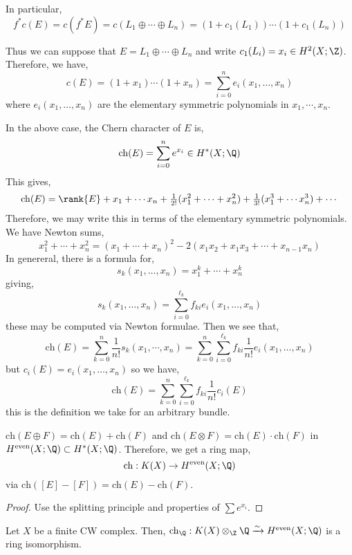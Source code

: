 \documentclass[12pt]{extarticle}
\begin{document}
\begin{rmk}
In particular, 
\[ f^* c(E) = c(f^* E) = c(L_1 \oplus \cdots \oplus L_n) = (1 + c_1(L_1)) \cdots (1 + c_1(L_n)) \]
\end{rmk}

\begin{rmk}
Thus we can suppose that $E = L_1 \oplus \cdots \oplus L_n$ and write $c_1(L_i) = x_i \in H^2(X; \Z)$. Therefore, we have,
\[ c(E) = (1 + x_1) \cdots (1 + x_n) = \sum_{i = 0}^n e_i(x_1, \dots, x_n) \]
where $e_i(x_1, \dots, x_n)$ are the elementary symmetric polynomials in $x_1, \cdots, x_n$.
\end{rmk}

\newcommand{\ch}{\mathrm{ch}}

\begin{defn}
In the above case, the Chern character of $E$ is,
\[ \ch(E) = \sum_{i = 0}^n e^{x_i} \in H^*(X; \Q) \]
This gives,
\[ \ch(E) = \rank{E} + x_1 + \cdots x_n + \tfrac{1}{2!} (x_1^2 + \cdots + x_n^2) + \tfrac{1}{3!} (x_1^3 + \cdots x_n^3) + \cdots \]
Therefore, we may write this in terms of the elementary symmetric polynomials. We have Newton sums,
\[ x_1^2 + \cdots + x_n^2 = (x_1 + \cdots + x_n)^2 - 2(x_1 x_2 + x_1 x_3 + \cdots + x_{n-1} x_n) \]
In genereral, there is a formula for,
\[ s_k(x_1, \dots, x_n) = x_1^k + \cdots + x_n^k \]
giving,
\[ s_k(x_1, \dots, x_n) = \sum_{i = 0}^{\ell_k} f_{k i} e_i(x_1, \dots, x_n) \]
these may be computed via Newton formulae. Then we see that,
\[ \ch(E) = \sum_{k = 0}^n \frac{1}{n!} s_k(x_1, \cdots, x_n) = \sum_{k = 0}^n \sum_{i = 0}^{\ell_k} f_{k i} \frac{1}{n!} e_i(x_1, \dots, x_n) \]
but $c_i(E) = e_i(x_1, \dots, x_n)$ so we have,
\[ \ch(E) =  \sum_{k = 0}^n \sum_{i = 0}^{\ell_k} f_{k i} \frac{1}{n!} c_i(E) \]
this is the definition we take for an arbitrary bundle.
\end{defn}

\begin{lemma}
$\ch(E \oplus F) = \ch(E) + \ch(F)$ and $\ch(E \otimes F) = \ch(E) \cdot \ch(F)$ in $H^{\text{even}}(X; \Q) \subset H^*(X; \Q)$.
Therefore, we get a ring map,
\[ \ch : K(X) \to H^{\text{even}}(X; \Q) \] 
via $\ch([E] - [F]) = \ch(E) - \ch(F)$. 
\end{lemma}

\begin{proof}
Use the splitting principle and properties of $\sum e^{x_i}$. 
\end{proof}

\begin{theorem}
Let $X$ be a finite CW complex. Then,
$\ch_\Q : K(X) \otimes_\Z \Q \xrightarrow{\sim} H^{\text{even}}(X; \Q)$ is a ring isomorphism. 
\end{theorem}
\end{document}
